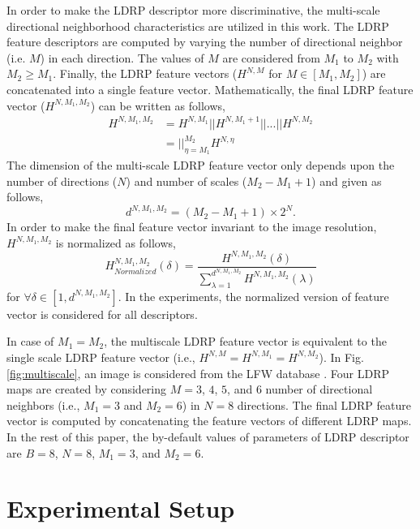 \documentclass[a4paper]{article}
\begin{document}
In order to make the LDRP descriptor more discriminative, the multi-scale directional neighborhood characteristics are utilized in this work. The LDRP feature descriptors are computed by varying the number of directional neighbor (i.e. $M$) in each direction. The values of $M$ are considered from $M_1$ to $M_2$ with $M_2 \geq M_1$. Finally, the LDRP feature vectors ($H^{N,M}$ for $M \in [M_1, M_2]$) are concatenated into a single feature vector. Mathematically, the final LDRP feature vector ($H^{N,M_1,M_2}$) can be written as follows,
\begin{equation}
\begin{split}
H^{N,M_1,M_2} & = H^{N,M_1}  ||  H^{N,M_1+1}  ||  ...  ||  H^{N,M_2} \\
& = {||}_{\eta=M_1}^{M_2} H^{N,\eta}
\end{split}
\end{equation}
The dimension of the multi-scale LDRP feature vector only depends upon the number of directions ($N$) and number of scales ($M_2 - M_1 + 1$) and given as follows,
\begin{equation}
d^{N,M_1,M_2}=(M_2 - M_1 + 1) \times 2^N. 
\end{equation}
In order to make the final feature vector invariant to the image resolution, $H^{N,M_1,M_2}$ is normalized as follows,
\begin{equation}
H_{Normalized}^{N,M_1,M_2}(\delta) = \frac{H^{N,M_1,M_2}(\delta)}{\sum_{\lambda = 1}^{d^{N,M_1,M_2}}H^{N,M_1,M_2}(\lambda)}
\end{equation}
for $\forall \delta \in [1, d^{N,M_1,M_2}]$. In the experiments, the normalized version of feature vector is considered for all descriptors.

In case of $M_1=M_2$, the multiscale LDRP feature vector is equivalent to the single scale LDRP feature vector (i.e., $H^{N,M}=H^{N,M_1}=H^{N,M_2}$).
In Fig. \ref{fig:multiscale}, an image is considered from the LFW database \cite{lfw}. Four LDRP maps are created by considering $M=3$, $4$, $5$, and $6$ number of directional neighbors (i.e., $M_1=3$ and $M_2=6$) in $N=8$ directions. The final LDRP feature vector is computed by concatenating the feature vectors of different LDRP maps. In the rest of this paper, the by-default values of parameters of LDRP descriptor are $B=8$, $N=8$, $M_1=3$, and $M_2=6$. 

\section{Experimental Setup}
\end{document}
